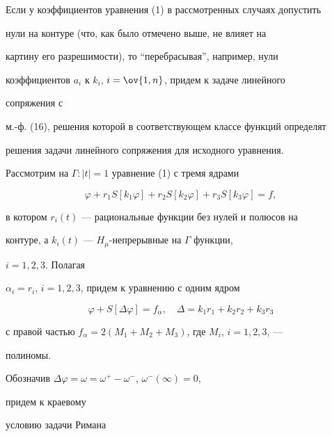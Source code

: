  


Если у коэффициентов уравнения (1) в рассмотренных случаях допустить 


нули на контуре (что, как было отмечено выше, не влияет на 


картину его разрешимости), то ``перебрасывая'', например, нули 


коэффициентов $a_i$ к $k_i$, $i=\ov{1,n}$, придем к задаче линейного 


сопряжения с 


м.-ф. (16), решения которой в соответствующем классе функций определят 


решения задачи линейного сопряжения для исходного уравнения. 


 


\begin{examnonum} 


Рассмотрим на $\Gamma:|t|=1$ уравнение (1) с тремя ядрами 


\begin{equation} 


\varphi+r_1S[k_1\varphi]+r_2S[k_2\varphi]+ 


r_3S[k_3\varphi]=f, 


\end{equation} 


в котором $r_i(t)$ --- рациональные функции без нулей и полюсов на 


контуре, а $k_i(t)$ --- $H_\mu$-непрерывные на $\Gamma$ функции, 


$i=1,2,3$. Полагая 


$\alpha_i=r_i$, $i=1,2,3$, придем к уравнению с одним ядром 


\begin{equation} 


\varphi+S[\Delta\varphi]=f_\alpha,\quad 


\Delta=k_1r_1+k_2r_2+k_3r_3 


\end{equation} 


с правой частью $f_\alpha=2(M_1+M_2+M_3)$, где $M_i$, $i=1,2,3$, --- 


полиномы. 


Обозначив $\Delta\varphi=\omega=\omega^+-\omega^-$, $\omega^-(\infty)=0$, 


придем к краевому 


условию задачи Римана 


\begin{equation} 



\end{equation}
\end{examnonum}

